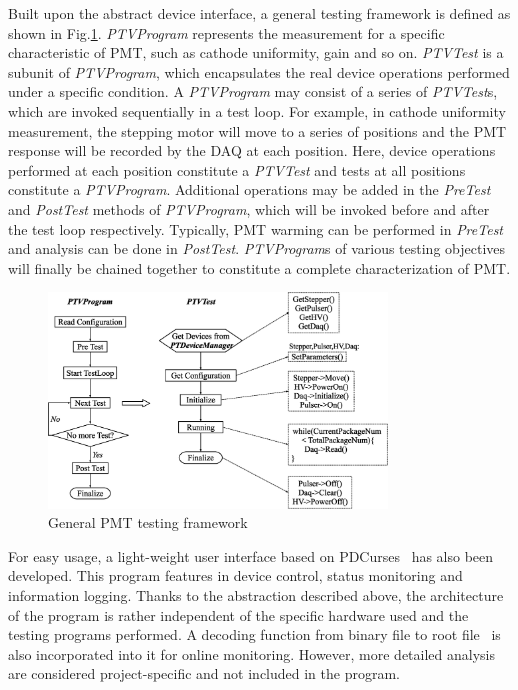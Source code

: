 \documentclass[5p, times]{elsarticle}
\begin{document}
Built upon the abstract device interface, a general testing framework is defined as shown in Fig.\ref{fig:software_framework}.
\textit{PTVProgram} represents the measurement for a specific characteristic of PMT, such as cathode uniformity, gain and so on.
\textit{PTVTest} is a subunit of \textit{PTVProgram}, which encapsulates the real device operations performed under a specific condition.
A \textit{PTVProgram} may consist of a series of \textit{PTVTest}s, which are invoked sequentially in a test loop.
For example, in cathode uniformity measurement, the stepping motor will move to a series of positions and the PMT response will be recorded by the DAQ at each position.
Here, device operations performed at each position constitute a \textit{PTVTest} and tests at all positions constitute a \textit{PTVProgram}.
Additional operations may be added in the \textit{PreTest} and \textit{PostTest} methods of \textit{PTVProgram}, which will be invoked before and after the test loop respectively.
Typically, PMT warming can be performed in \textit{PreTest} and analysis can be done in \textit{PostTest}.
\textit{PTVProgram}s of various testing objectives will finally be chained together to constitute a complete characterization of PMT.

\begin{figure}
  \centering
 \includegraphics[width=90mm]{software_framework}
\caption{General PMT testing framework}
\label{fig:software_framework}
\end{figure}

For easy usage, a light-weight user interface based on PDCurses~\cite{pdcurses} has also been developed.
This program features in device control, status monitoring and information logging.
Thanks to the abstraction described above, the architecture of the program is rather independent of the specific hardware used and the testing programs performed.
A decoding function from binary file to root file~\cite{root} is also incorporated into it for online monitoring.
However, more detailed analysis are considered project-specific and not included in the program. 
\end{document}
